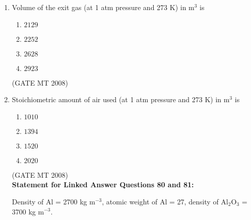 \documentclass[journal, 11pt, onecolumn]{IEEEtran}
\theoremstyle{remark}
\begin{document}
\begin{enumerate}
\textbf{Statement for Linked Answer Questions 78 and 79:}

1000 kg of zinc concentrate of composition 78\% ZnS and 22\% inerts is roasted in a multiple hearth furnace.
Roasting converts ZnS to ZnO, SO$_2$ and SO$_3$. The exit gas contains 6 vol.\% SO$_2$ and 2 vol.\% SO$_3$. \\
Molecular weights: Zn = 65, S = 32, O$_2$ = 32. \\
Composition of air (in vol.\%) = 21\% O$_2$ and 79\% N$_2$. \\
1 kg mol of gas occupies 22.4 m$^3$ at 273 K and 1 atm.

\item Volume of the exit gas (at 1 atm pressure and 273 K) in m$^3$ is
\begin{multicols}{4}
\begin{enumerate} 
\item $2129$
\item $2252$
\item $2628$
\item $2923$
\end{enumerate}
\end{multicols}
\hfill(GATE MT 2008)
\item Stoichiometric amount of air used (at 1 atm pressure and 273 K) in m$^3$ is
\begin{multicols}{4}
\begin{enumerate} 
\item $1010$
\item $1394$
\item $1520$
\item $2020$
\end{enumerate}
\end{multicols}
\hfill(GATE MT 2008)\\


\textbf{Statement for Linked Answer Questions 80 and 81:}

Density of Al = 2700 kg m$^{-3}$, atomic weight of Al = 27, density of Al$_2$O$_3$ = 3700 kg m$^{-3}$.


\end{enumerate}
\end{document}
